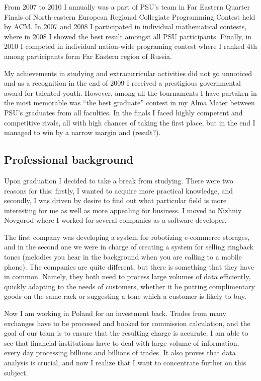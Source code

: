 \documentclass[a4paper,14pt]{extarticle}
\begin{document}
From 2007 to 2010 I annually was a part of PSU's team in Far Eastern Quarter Finals of North-eastern European Regional Collegiate Programming Contest held by ACM. In 2007 and 2008 I participated in individual mathematical contests, where in 2008 I showed the best result amongst all PSU participants. Finally, in 2010 I competed in individual nation-wide programing contest where I ranked 4th among participants form Far Eastern region of Russia.

My achievements in studying and extracurricular activities did not go unnoticed and as a recognition in the end of 2009 I received a prestigious governmental award for talented youth. However, among all the tournaments I have partaken in the most memorable was ``the best graduate'' contest in my Alma Mater between PSU's graduates from all faculties. In the finals I faced highly competent and competitive rivals, all with high chances of taking the first place, but in the end I managed to win by a narrow margin and (result?).

\subsection*{Professional background}

Upon graduation I decided to take a break from studying. There were two reasons for this: firstly, I wanted to acquire more practical knowledge, and secondly, I was driven by desire to find out what particular field is more interesting for me as well as more appealing for business. I moved to Nizhniy Novgorod where I worked for several companies as a software developer.

The first company was developing a system for robotizing e-commerce storages, and in the second one we were in charge of creating a system for selling ringback tones (melodies you hear in the background when you are calling to a mobile phone). The companies are quite different, but there is something that they have in common. Namely, they both need to process large volumes of data efficiently, quickly adapting to the needs of customers, whether it be putting complimentary goods on the same rack or suggesting a tone which a customer is likely to buy.

Now I am working in Poland for an investment back. Trades from many exchanges have to be processed and booked for commission calculation, and the goal of our team is to ensure that the resulting charge is accurate. I am able to see that financial institutions have to deal with large volume of information, every day processing billions and billions of trades. It also proves that data analysis is crucial, and now I realize that I want to concentrate further on this subject.
\end{document}
